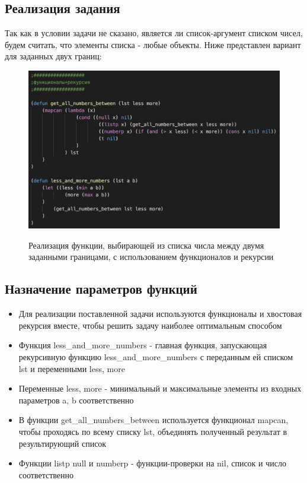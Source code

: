 \documentclass[a4paper,12pt]{article}
\begin{document}
 	\subsection*{Реализация задания}
 	
 	Так как в условии задачи не сказано, является ли список-аргумент списком чисел, будем считать, что элементы списка - любые объекты.
 	Ниже представлен вариант для заданных двух границ:
 	
 	\begin{figure}[h!]
 		\begin{center}
 			{\includegraphics[scale = 0.8]{6.4.png}}
 			\label{ris:6.4}
 		\end{center}
 	\caption{Реализация функции, выбирающей из списка числа между двумя заданными границами, с использованием функционалов и рекурсии}
 	\end{figure}
 	
 	\subsection*{Назначение параметров функций}
 	
 	\begin{itemize}
 		\item Для реализации поставленной задачи используются функционалы и хвостовая рекурсия вместе, чтобы решить задачу наиболее оптимальным способом
 		\item Функция less\_and\_more\_numbers - главная функция, запускающая рекурсивную функцию less\_and\_more\_numbers с переданным ей списком lst и переменными less, more
 		\item Переменные less, more - минимальный и максимальные элементы из входных параметров a, b соответственно
 		\item В функции get\_all\_numbers\_between используется функционал mapcan, чтобы проходясь по всему списку lst, объединять полученный результат в результирующий список
 		\item Функции listp null и numberp - функции-проверки на nil, список и число соответственно
 	\end{itemize}
 	
\end{document}
